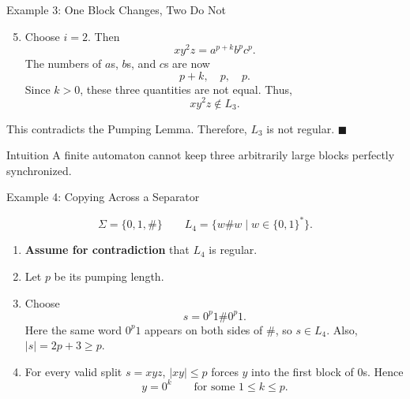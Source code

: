 \documentclass[10pt,aspectratio=169]{beamer}
\begin{document}
\begin{frame}{Example 3: One Block Changes, Two Do Not}

\small
\begin{enumerate}
    \setcounter{enumi}{4}
    \item Choose $i=2$. Then
    \[
    xy^2z=a^{p+k}b^pc^p.
    \]
    The numbers of $a$s, $b$s, and $c$s are now
    \[
    p+k,\quad p,\quad p.
    \]
    Since $k>0$, these three quantities are not equal. Thus,
    \[
    xy^2z\notin L_3.
    \]
\end{enumerate}

This contradicts the Pumping Lemma. Therefore, $L_3$ is not regular.
\hfill $\blacksquare$

\vspace{0.7em}
\begin{block}{Intuition}
A finite automaton cannot keep three arbitrarily large blocks perfectly synchronized.
\end{block}

\end{frame}

\begin{frame}{Example 4: Copying Across a Separator}

\small
\[
\Sigma = \{0, 1, \#\} \qquad 
L_4=\{w\#w\mid w\in\{0,1\}^*\}.
\]

\begin{enumerate}
    \item \textbf{Assume for contradiction} that $L_4$ is regular.
    \item Let $p$ be its pumping length.
    \item Choose
    \[
    s=0^p1\#0^p1.
    \]
    Here the same word $0^p1$ appears on both sides of $\#$, so $s\in L_4$.
    Also, $|s|=2p+3\geq p$.
    \item For every valid split $s=xyz$, $|xy|\leq p$ forces $y$ into the first block of $0$s. Hence
    \[
    y=0^k\qquad\text{for some }1\leq k\leq p.
    \]
\end{enumerate}

\end{frame}
\end{document}
